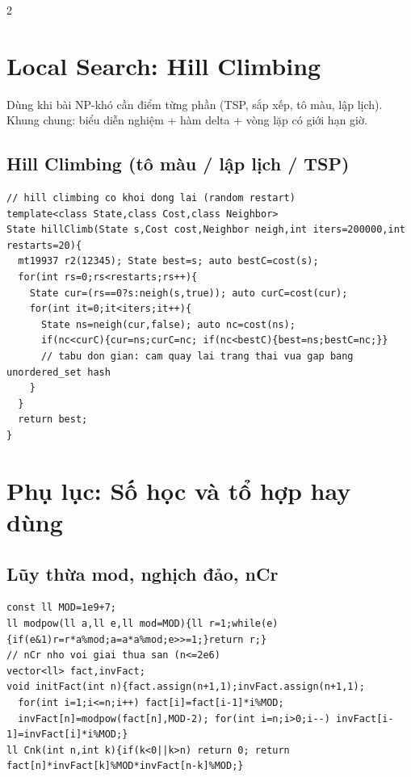 \documentclass[8pt]{extarticle}
\begin{document}
\begin{multicols}{2}
\section{Local Search: Hill Climbing}
Dùng khi bài NP-khó cần điểm từng phần (TSP, sắp xếp, tô màu, lập lịch). Khung chung: biểu diễn nghiệm + hàm delta + vòng lặp có giới hạn giờ.

\subsection{Hill Climbing (tô màu / lập lịch / TSP)}
\begin{lstlisting}
// hill climbing co khoi dong lai (random restart)
template<class State,class Cost,class Neighbor>
State hillClimb(State s,Cost cost,Neighbor neigh,int iters=200000,int restarts=20){
  mt19937 r2(12345); State best=s; auto bestC=cost(s);
  for(int rs=0;rs<restarts;rs++){
    State cur=(rs==0?s:neigh(s,true)); auto curC=cost(cur);
    for(int it=0;it<iters;it++){
      State ns=neigh(cur,false); auto nc=cost(ns);
      if(nc<curC){cur=ns;curC=nc; if(nc<bestC){best=ns;bestC=nc;}}
      // tabu don gian: cam quay lai trang thai vua gap bang unordered_set hash
    }
  }
  return best;
}
\end{lstlisting}

\section{Phụ lục: Số học và tổ hợp hay dùng}
\subsection{Lũy thừa mod, nghịch đảo, nCr}
\begin{lstlisting}
const ll MOD=1e9+7;
ll modpow(ll a,ll e,ll mod=MOD){ll r=1;while(e){if(e&1)r=r*a%mod;a=a*a%mod;e>>=1;}return r;}
// nCr nho voi giai thua san (n<=2e6)
vector<ll> fact,invFact;
void initFact(int n){fact.assign(n+1,1);invFact.assign(n+1,1);
  for(int i=1;i<=n;i++) fact[i]=fact[i-1]*i%MOD;
  invFact[n]=modpow(fact[n],MOD-2); for(int i=n;i>0;i--) invFact[i-1]=invFact[i]*i%MOD;}
ll Cnk(int n,int k){if(k<0||k>n) return 0; return fact[n]*invFact[k]%MOD*invFact[n-k]%MOD;}
\end{lstlisting}


\end{multicols}
\end{document}
